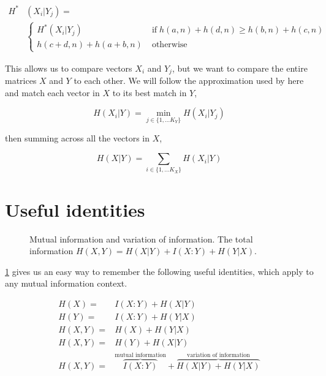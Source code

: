 \documentclass[9pt,technote]{IEEEtran}
\begin{document}
\begin{equation}
	\begin{split}
	H^* & (X_i | Y_j) = \\
	& \left\{
		\begin{split}
			H^*(X_i | Y_j) \; & \mbox{if} \; h(a,n) + h(d,n) \geq h(b,n) + h(c,n) \\
			h(c+d,n)+h(a+b,n) \;  & \mbox{otherwise}
		\end{split}
	\right.
	\end{split}
\end{equation}

This allows us to compare vectors $X_i$ and $Y_j$, but we want to compare the entire matrices
$X$ and $Y$ to each other. We will follow the approximation used by \lfk here and
match each vector in $X$ to its best match in $Y$,

\begin{equation}
	H(X_i | Y) = \underset{j \in \{1,\dots K_Y \}}{\min} H(X_i | Y_j)
	\label{eqnBestMatch}
\end{equation}

then summing across all the vectors in $X$,

\begin{equation}
	H(X | Y) = \sum_{i \in \{1,\dots K_X \}} H(X_i | Y)
\end{equation}

\section{Useful identities}

\begin{figure}
	\centering
{}
\caption{\label{figVenn} Mutual information and variation of information. The total information $H(X,Y) = H(X|Y) + I(X:Y) + H(Y|X)$. }
\end{figure}


\cref{figVenn} gives us an easy way to remember the following useful identities, which
apply to any mutual information context.

\begin{align*}
	H(X) = & I(X:Y) + H(X|Y) \\
	H(Y) = & I(X:Y) + H(Y|X) \\
	H(X,Y) = & H(X) + H(Y|X) \\
	H(X,Y) = & H(Y) + H(X|Y) \\
	H(X,Y) = & \overbrace{I(X:Y)}^\text{mutual information} + \overbrace{H(X|Y) + H(Y|X)}^\text{variation of information}
\end{align*}
\end{document}
